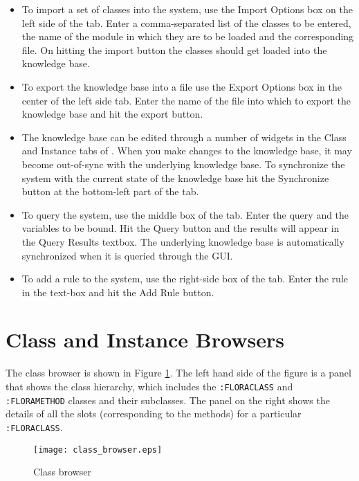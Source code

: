 \begin{itemize}
\item To import a set of \FLORA classes into the system, use the
Import Options box on the left side of the tab. Enter a
comma-separated list of the classes to be entered, the name of the
module in which they are to be loaded and the corresponding \FLORA
file. On hitting the import button the \FLORA classes should get
loaded into the \Protege knowledge base.

\item To export the \Protege knowledge base into a \FLORA file use
the Export Options box in the center of the left side tab. Enter the
name of the file into which to export the \Protege knowledge base
and hit the export button.

\item The \Protege knowledge base can be edited through a number of
widgets in the Class and Instance tabs of \NoProtege. When you make
changes to the \Protege knowledge base, it may become out-of-sync
with the underlying \FLORA knowledge base. To synchronize the \FLORA
system with the current state of the \Protege knowledge base hit the
Synchronize button at the bottom-left part of the tab.

\item To query the \FLORA system, use the middle box of the tab.
Enter the query and the variables to be bound. Hit the Query button
and the results will appear in the Query Results textbox. The
underlying \FLORA knowledge base is automatically synchronized when it is
queried through the GUI.

\item To add a rule to the \FLORA system, use the right-side box of
the tab. Enter the rule in the text-box and hit the Add Rule button.
\end{itemize}

\section{Class and Instance Browsers}

The class browser is shown in Figure \ref{fig:flora-cls_browser}.
The left hand side of the figure is a panel that shows the class
hierarchy, which includes the {\tt :FLORACLASS} and {\tt
:FLORAMETHOD} classes and their subclasses. The panel on the right
shows the details of all the slots (corresponding to the \FLORA
methods) for a particular {\tt :FLORACLASS}.
\begin{figure}
\begin{center}
\texttt{[image: class\_browser.eps]}
\caption{Class browser} \label{fig:flora-cls_browser}
\end{center}
\end{figure}

